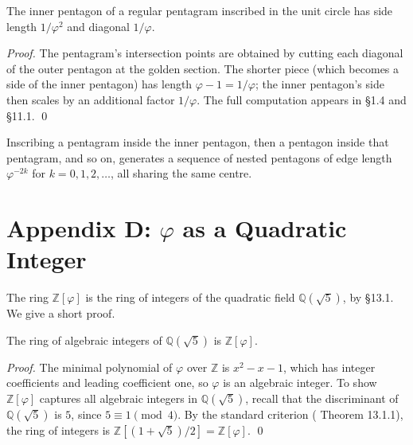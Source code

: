 \begin{lemma}
\label{fa_01:lem:01-pentagram-self}
The inner pentagon of a regular pentagram inscribed in the unit
circle has side length $1/\varphi^2$ and diagonal $1/\varphi$.
\end{lemma}

\begin{proof}
The pentagram's intersection points are obtained by cutting each
diagonal of the outer pentagon at the golden section. The shorter
piece (which becomes a side of the inner pentagon) has length $\varphi
- 1 = 1/\varphi$; the inner pentagon's side then scales by an
additional factor $1/\varphi$. The full computation appears in
\cite{coxeter_intro_geometry} \S 1.4 and
\cite{coxeter_regular_polytopes} \S 11.1.
\qed
\end{proof}

\begin{corollary}\label{fa_01:cor:01-cascade}
Inscribing a pentagram inside the inner pentagon, then a pentagon
inside that pentagram, and so on, generates a sequence of nested
pentagons of edge length $\varphi^{-2k}$ for $k = 0, 1, 2, \ldots$,
all sharing the same centre.
\end{corollary}

\section*{Appendix D: $\varphi$ as a Quadratic Integer}
\label{fa_01:sec:01-app-D}

The ring $\mathbb{Z}[\varphi]$ is the ring of integers of the
quadratic field $\mathbb{Q}(\sqrt 5)$, by
\cite{ireland_rosen} \S 13.1. We give a short proof.

\begin{theorem}
\label{fa_01:thm:01-ring-int}
The ring of algebraic integers of $\mathbb{Q}(\sqrt 5)$ is
$\mathbb{Z}[\varphi]$.
\end{theorem}

\begin{proof}
The minimal polynomial of $\varphi$ over $\mathbb{Z}$ is $x^2 - x -
1$, which has integer coefficients and leading coefficient one, so
$\varphi$ is an algebraic integer. To show $\mathbb{Z}[\varphi]$
captures all algebraic integers in $\mathbb{Q}(\sqrt 5)$, recall that
the discriminant of $\mathbb{Q}(\sqrt 5)$ is $5$, since $5 \equiv 1
\pmod{4}$. By the standard criterion
(\cite{ireland_rosen} Theorem 13.1.1), the ring of integers is
$\mathbb{Z}[(1 + \sqrt 5)/2] = \mathbb{Z}[\varphi]$.
\qed
\end{proof}

